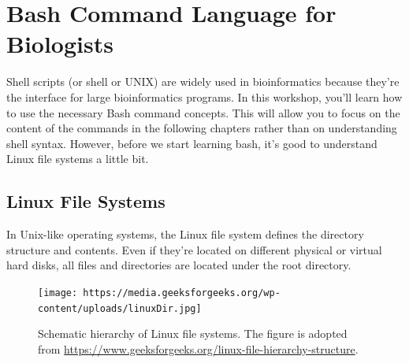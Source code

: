 \documentclass[
  letterpaper,
  DIV=11,
  numbers=noendperiod]{scrreprt}
\begin{document}

\hypertarget{bash-command-language-for-biologists}{%
\chapter{Bash Command Language for
Biologists}\label{bash-command-language-for-biologists}}

Shell scripts (or shell or UNIX) are widely used in bioinformatics
because they're the interface for large bioinformatics programs. In this
workshop, you'll learn how to use the necessary Bash command concepts.
This will allow you to focus on the content of the commands in the
following chapters rather than on understanding shell syntax. However,
before we start learning bash, it's good to understand Linux file
systems a little bit.

\hypertarget{linux-file-systems}{%
\section{Linux File Systems}\label{linux-file-systems}}

In Unix-like operating systems, the Linux file system defines the
directory structure and contents. Even if they're located on different
physical or virtual hard disks, all files and directories are located
under the root directory.

\begin{figure}

{\centering \texttt{[image: https://media.geeksforgeeks.org/wp-content/uploads/linuxDir.jpg]}

}

\caption{Schematic hierarchy of Linux file systems. The figure is
adopted from
\url{https://www.geeksforgeeks.org/linux-file-hierarchy-structure}.}

\end{figure}
\end{document}
